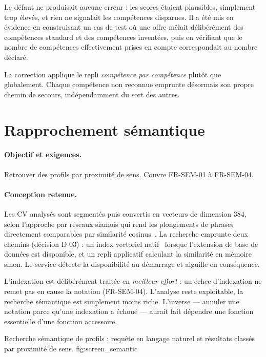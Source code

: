 Le défaut ne produisait aucune erreur : les scores étaient plausibles,
simplement trop élevés, et rien ne signalait les compétences disparues. Il a
été mis en évidence en construisant un cas de test où une offre mêlait
délibérément des compétences standard et des compétences inventées, puis en
vérifiant que le nombre de compétences effectivement prises en compte
correspondait au nombre déclaré.

La correction applique le repli \emph{compétence par compétence} plutôt que
globalement. Chaque compétence non reconnue emprunte désormais son propre
chemin de secours, indépendamment du sort des autres.

\section{Rapprochement sémantique}
\label{sec:impl_semantic}

\paragraph{Objectif et exigences.} Retrouver des profils par proximité de sens.
Couvre FR-SEM-01 à FR-SEM-04.

\paragraph{Conception retenue.} Les CV analysés sont segmentés puis convertis
en vecteurs de dimension 384, selon l'approche par réseaux siamois qui rend
les plongements de phrases directement comparables par similarité
cosinus~\cite{reimers2019sbert}. La recherche emprunte deux chemins
(décision D-03) : un index vectoriel natif~\cite{pgvector} lorsque l'extension
de base de données est disponible, et un repli applicatif calculant la
similarité en mémoire sinon. Le service détecte la disponibilité au démarrage et aiguille en
conséquence.

L'indexation est délibérément traitée en \emph{meilleur effort} : un échec
d'indexation ne remet pas en cause la notation (FR-SEM-04). L'analyse reste
exploitable, la recherche sémantique est simplement moins riche. L'inverse —
annuler une notation parce qu'une indexation a échoué — aurait fait dépendre
une fonction essentielle d'une fonction accessoire.

  {Recherche sémantique de profils : requête en langage naturel et résultats
   classés par proximité de sens.}
  {fig:screen_semantic}


